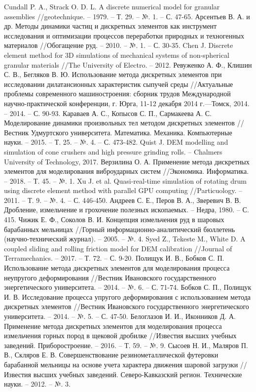 \documentclass[utf8x, 14pt, oneside, a4paper]{article}
\begin{document}
		
\begin{thebibliography}{99}
 Cundall P. A., Strack O. D. L. A discrete numerical model for granular assemblies //geotechnique. – 1979. – Т. 29. – №. 1. – С. 47-65.
 Арсентьев В. А. и др. Методы динамики частиц и дискретных элементов как инструмент исследования и оптимизации процессов переработки природных и техногенных материалов //Обогащение руд. – 2010. – №. 1. – С. 30-35.
 Chen J. Discrete element method for 3D simulations of mechanical systems of non-spherical granular materials //The University of Electro. – 2012.
 Ревуженко А. Ф., Клишин С. В., Бегляков В. Ю. Использование метода дискретных элементов при исследовании дилатансионных характеристик сыпучей среды //Актуальные проблемы современного машиностроения: сборник трудов Международной научно-практической конференции, г. Юрга, 11-12 декабря 2014 г.—Томск, 2014. – 2014. – С. 90-93.
 Караваев А. С., Копысов С. П., Сармакеева А. С. Моделирование динамики произвольных тел методом дискретных элементов //Вестник Удмуртского университета. Математика. Механика. Компьютерные науки. – 2015. – Т. 25. – №. 4. – С. 473-482.
 Quist J. DEM modelling and simulation of cone crushers and high pressure grinding rolls. – Chalmers University of Technology, 2017.
 Верзилина О. А. Применение метода дискретных элементов для моделирования виброударных систем //Экономика. Информатика. – 2018. – Т. 45. – №. 1.
 Xu J. et al. Quasi-real-time simulation of rotating drum using discrete element method with parallel GPU computing //Particuology. – 2011. – Т. 9. – №. 4. – С. 446-450.
 Андреев С. Е., Перов В. А., Зверевич В. В. Дробление, измельчение и грохочение полезных ископаемых. – Недра, 1980. – С. 415.
 Чижик Е. Ф., Соколов В. И. Концепция измельчения руд в шаровых барабанных мельницах //Горный информационно-аналитический бюллетень (научно-технический журнал). – 2005. – №. 4.
 Syed Z., Tekeste M., White D. A coupled sliding and rolling friction model for DEM calibration //Journal of Terramechanics. – 2017. – Т. 72. – С. 9-20.
 Полищук И. В., Бобков С. П. Использование метода дискретных элементов для моделирования процесса неупругого деформирования //Вестник Ивановского государственного энергетического университета. – 2014. – №. 6. – С. 71-74.
 Бобков С. П., Полищук И. В. Исследование процесса упругого деформирования с использованием метода дискретных элементов //Вестник Ивановского государственного энергетического университета. – 2014. – №. 5. – С. 47-50.
 Белоглазов И. И., Иконников Д. А. Применение метода дискретных элементов для моделирования процесса измельчения горных пород в щековой дробилке //Известия высших учебных заведений. Приборостроение. – 2016. – Т. 59. – №. 9.
 Сысоев Н. И., Маляров П. В., Скляров Е. В. Совершенствование резинометаллической футеровки барабанной мельницы на основе учета характера движения шаровой загрузки //Известия высших учебных заведений. Северо-Кавказский регион. Технические науки. – 2012. – №. 3.


\end{thebibliography}
\end{document}
